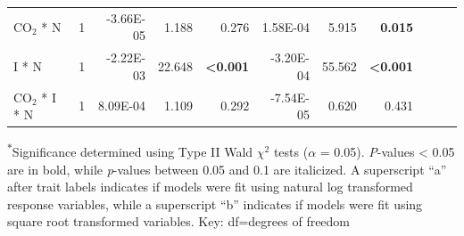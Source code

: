 \begin{landscape}
\begin{table}
{\begin{tabular}{p{3cm}p{0.5cm}p{1.75cm}p{1.5cm}p{1.5cm}p{1.75cm}p{1.5cm}p{1.5cm}p{1.75cm}p{1.5cm}p{1.5cm}}
            CO$_2$ * N & \multicolumn{1}{r}{1}
            & \multicolumn{1}{r}{-3.66E-05}     & \multicolumn{1}{r}{1.188}         & \multicolumn{1}{r}{0.276}
            & \multicolumn{1}{r}{1.58E-04}      & \multicolumn{1}{r}{5.915}         & \multicolumn{1}{r}{\textbf{0.015}}
            & \multicolumn{1}{r}{}              & \multicolumn{1}{r}{}              & \multicolumn{1}{r}{} 
            \\

            I * N & \multicolumn{1}{r}{1}
            & \multicolumn{1}{r}{-2.22E-03}     & \multicolumn{1}{r}{22.648}        & \multicolumn{1}{r}{\textbf{<0.001}}
            & \multicolumn{1}{r}{-3.20E-04}     & \multicolumn{1}{r}{55.562}        & \multicolumn{1}{r}{\textbf{<0.001}}
            & \multicolumn{1}{r}{}              & \multicolumn{1}{r}{}              & \multicolumn{1}{r}{} 
            \\

            CO$_2$ * I * N & \multicolumn{1}{r}{1}
            & \multicolumn{1}{r}{8.09E-04}      & \multicolumn{1}{r}{1.109}         & \multicolumn{1}{r}{0.292}
            & \multicolumn{1}{r}{-7.54E-05}     & \multicolumn{1}{r}{0.620}         & \multicolumn{1}{r}{0.431}
            & \multicolumn{1}{r}{}              & \multicolumn{1}{r}{}              & \multicolumn{1}{r}{} 
            \\
            \hline
    \end{tabular}}
    \label{tab:table5.4}
    \end{table}
\begin{singlespace}
    \noindent \textsuperscript{$*$}Significance determined using Type II Wald $\chi^{2}$ tests ($\alpha$ = 0.05). \textit{P}-values < 0.05 are in bold, while \textit{p}-values between 0.05 and 0.1 are italicized. A superscript “a” after trait labels indicates if models were fit using natural log transformed response variables, while a superscript “b” indicates if models were fit using square root transformed variables. Key: df=degrees of freedom
\end{singlespace}
\end{landscape}
\clearpage

